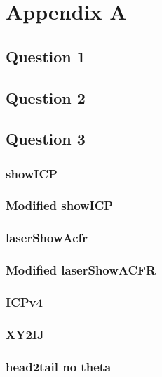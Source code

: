 \newpage
\renewcommand{\thesubsection}{\thesection.\arabic{subsection}}
\section{Appendix A}
	\subsection{Question 1}
	\pagebreak
	
	\subsection{Question 2}
	\pagebreak
	
	\subsection{Question 3}
		\subsubsection{showICP}
		
		\pagebreak
		\subsubsection{Modified showICP}
			
		\pagebreak
		\subsubsection{laserShowAcfr}
			
		\pagebreak
		\subsubsection{Modified laserShowACFR}
			
		\pagebreak
		\subsubsection{ICPv4}
			
		\pagebreak
		\subsubsection{XY2IJ}
			
		\pagebreak
		\subsubsection{head2tail no theta}
			
		\pagebreak
		
